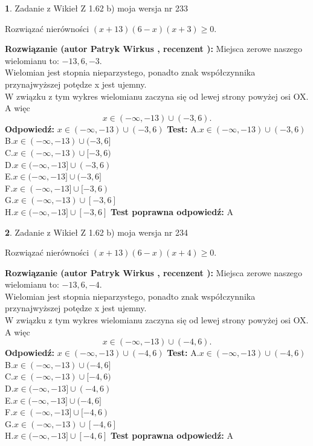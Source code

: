 \documentclass[12pt, a4paper]{article}
\theoremstyle{definition} %
\newtheorem{zad}{}
\newcommand{\zadStart}[1]{\begin{zad}#1\newline}
\newcommand{\zadStop}{\end{zad}}
\newcommand{\rozwStart}[2]{\noindent \textbf{Rozwiązanie (autor #1 , recenzent #2): }\newline}
\newcommand{\rozwStop}{\newline}
\newcommand{\odpStart}{\noindent \textbf{Odpowiedź:}\newline}
\newcommand{\odpStop}{\newline}
\newcommand{\testStart}{\noindent \textbf{Test:}\newline}
\newcommand{\testStop}{\newline}
\newcommand{\kluczStart}{\noindent \textbf{Test poprawna odpowiedź:}\newline}
\newcommand{\kluczStop}{\newline}
\begin{document}
\zadStart{Zadanie z Wikieł Z 1.62 b) moja wersja nr 233}

Rozwiązać nierówności $(x+13)(6-x)(x+3)\ge0$.
\zadStop
\rozwStart{Patryk Wirkus}{}
Miejsca zerowe naszego wielomianu to: $-13, 6, -3$.\\
Wielomian jest stopnia nieparzystego, ponadto znak współczynnika przy\linebreak najwyższej potędze x jest ujemny.\\ W związku z tym wykres wielomianu zaczyna się od lewej strony powyżej osi OX. A więc $$x \in (-\infty,-13) \cup (-3,6).$$
\rozwStop
\odpStart
$x \in (-\infty,-13) \cup (-3,6)$
\odpStop
\testStart
A.$x \in (-\infty,-13) \cup (-3,6)$\\
B.$x \in (-\infty,-13) \cup (-3,6]$\\
C.$x \in (-\infty,-13) \cup [-3,6)$\\
D.$x \in (-\infty,-13] \cup (-3,6)$\\
E.$x \in (-\infty,-13] \cup (-3,6]$\\
F.$x \in (-\infty,-13] \cup [-3,6)$\\
G.$x \in (-\infty,-13) \cup [-3,6]$\\
H.$x \in (-\infty,-13] \cup [-3,6]$
\testStop
\kluczStart
A
\kluczStop



\zadStart{Zadanie z Wikieł Z 1.62 b) moja wersja nr 234}

Rozwiązać nierówności $(x+13)(6-x)(x+4)\ge0$.
\zadStop
\rozwStart{Patryk Wirkus}{}
Miejsca zerowe naszego wielomianu to: $-13, 6, -4$.\\
Wielomian jest stopnia nieparzystego, ponadto znak współczynnika przy\linebreak najwyższej potędze x jest ujemny.\\ W związku z tym wykres wielomianu zaczyna się od lewej strony powyżej osi OX. A więc $$x \in (-\infty,-13) \cup (-4,6).$$
\rozwStop
\odpStart
$x \in (-\infty,-13) \cup (-4,6)$
\odpStop
\testStart
A.$x \in (-\infty,-13) \cup (-4,6)$\\
B.$x \in (-\infty,-13) \cup (-4,6]$\\
C.$x \in (-\infty,-13) \cup [-4,6)$\\
D.$x \in (-\infty,-13] \cup (-4,6)$\\
E.$x \in (-\infty,-13] \cup (-4,6]$\\
F.$x \in (-\infty,-13] \cup [-4,6)$\\
G.$x \in (-\infty,-13) \cup [-4,6]$\\
H.$x \in (-\infty,-13] \cup [-4,6]$
\testStop
\kluczStart
A
\kluczStop
\end{document}
